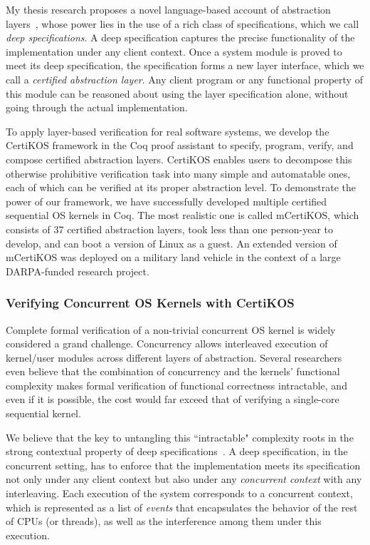 \documentclass[a4paper, 10pt]{article}
\begin{document}
\begin{small}
My thesis research proposes a novel language-based account of
abstraction layers~\cite{popl15-gu}, whose power lies in the use of a rich class of specifications, which we call \emph{deep specifications}. 
A deep specification captures
the precise functionality of the implementation under any client context. 
Once a system module is proved to meet its deep specification,
the specification forms a new layer interface, which we call a \emph{certified abstraction layer}.
Any client program or any functional property of this module
can be reasoned about using the  layer specification alone, without going through the actual implementation.

To apply layer-based verification for real software systems,
we develop the CertiKOS framework in the Coq proof assistant
to specify, program, verify, and compose certified abstraction
layers. CertiKOS enables users to decompose this otherwise prohibitive verification task into many simple and automatable ones, each of which can be verified at its proper abstraction level. 
To demonstrate the power of our framework,
 we have successfully developed multiple certified
sequential OS kernels in Coq. 
The most realistic one is called mCertiKOS,
which consists of 37 certified abstraction layers, 
took less than one person-year to develop,
and can boot a version of Linux as a guest.
An extended version of mCertiKOS was deployed on a military land vehicle in the context of a large DARPA-funded research project.

\subsubsection*{\small Verifying Concurrent OS Kernels with CertiKOS}
Complete formal verification of a non-trivial concurrent
OS kernel is widely considered a grand challenge. 
Concurrency allows interleaved
execution of kernel/user modules across different
layers of abstraction. 
Several researchers even believe that the combination of concurrency and the kernels’ functional complexity makes formal verification of functional correctness intractable,
and even if it is possible, the cost would far exceed that of
verifying a single-core sequential kernel.

We believe that the key to untangling this ``intractable" complexity roots in the
strong contextual property of deep specifications~\cite{osdi16-gu}.
A deep specification, in the concurrent setting, has to enforce  that
the implementation meets its specification 
not only under any client context but also under
any \emph{concurrent context} with any interleaving.
Each execution of the system corresponds to a  concurrent context, which is represented as a list of \emph{events} that encapsulates the behavior of the rest of CPUs (or threads), as well as the interference
among them under this execution.


\end{small}
\end{document}
